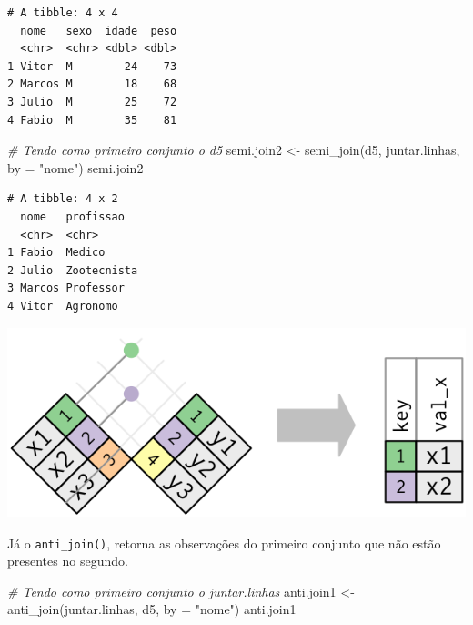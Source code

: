 \documentclass[
  brazilian,
]{book}
\newenvironment{Shaded}{\begin{snugshade}}{\end{snugshade}}
\newcommand{\AttributeTok}[1]{\textcolor[rgb]{0.77,0.63,0.00}{#1}}
\newcommand{\CommentTok}[1]{\textcolor[rgb]{0.56,0.35,0.01}{\textit{#1}}}
\newcommand{\FunctionTok}[1]{\textcolor[rgb]{0.00,0.00,0.00}{#1}}
\newcommand{\NormalTok}[1]{#1}
\newcommand{\OtherTok}[1]{\textcolor[rgb]{0.56,0.35,0.01}{#1}}
\newcommand{\StringTok}[1]{\textcolor[rgb]{0.31,0.60,0.02}{#1}}
\let\origfigure\figure
\let\endorigfigure\endfigure
\renewenvironment{figure}[1][2] {
    \expandafter\origfigure\expandafter[H]
} {
    \endorigfigure
}
\begin{document}
\begin{verbatim}
# A tibble: 4 x 4
  nome   sexo  idade  peso
  <chr>  <chr> <dbl> <dbl>
1 Vitor  M        24    73
2 Marcos M        18    68
3 Julio  M        25    72
4 Fabio  M        35    81
\end{verbatim}

\begin{Shaded}
\begin{Highlighting}[]
\CommentTok{\# Tendo como primeiro conjunto o \textasciigrave{}d5\textasciigrave{}}
\NormalTok{semi.join2 }\OtherTok{\textless{}{-}} \FunctionTok{semi\_join}\NormalTok{(d5, juntar.linhas, }\AttributeTok{by =} \StringTok{"nome"}\NormalTok{)}
\NormalTok{semi.join2}
\end{Highlighting}
\end{Shaded}

\begin{verbatim}
# A tibble: 4 x 2
  nome   profissao  
  <chr>  <chr>      
1 Fabio  Medico     
2 Julio  Zootecnista
3 Marcos Professor  
4 Vitor  Agronomo   
\end{verbatim}

\begin{figure}

{\centering \includegraphics[width=0.5\linewidth]{imagens/join-semi} 

}

\caption{Esquematização da função semi-join. Fonte: R for Data Science, 2017.}\label{fig:unnamed-chunk-179}
\end{figure}

Já o \texttt{anti\_join()}, retorna as observações do primeiro conjunto que não estão presentes no segundo.

\begin{Shaded}
\begin{Highlighting}[]
\CommentTok{\# Tendo como primeiro conjunto o \textasciigrave{}juntar.linhas\textasciigrave{}}
\NormalTok{anti.join1 }\OtherTok{\textless{}{-}} \FunctionTok{anti\_join}\NormalTok{(juntar.linhas, d5, }\AttributeTok{by =} \StringTok{"nome"}\NormalTok{)}
\NormalTok{anti.join1}
\end{Highlighting}
\end{Shaded}
\end{document}
